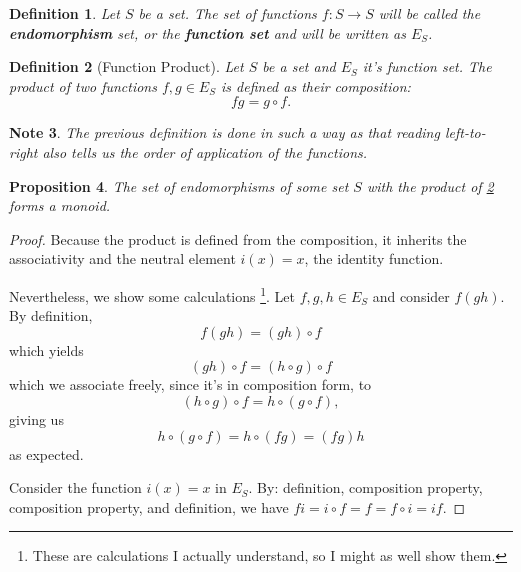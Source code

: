 \documentclass[11pt]{article}
\theoremstyle{plain}
\newtheorem{definition}{Definition}[section]
\newtheorem{note}[definition]{Note}
\newtheorem{proposition}[definition]{Proposition}
\theoremstyle{nonumberplain}
\newtheorem{proof}[definition]{Proof}
\begin{document}
\begin{definition}
    Let $S$ be a set. The set of functions $f : S \to S$ will be called the \textbf{endomorphism} set, or the \textbf{function set} and will be written as $E_S$.
\end{definition}

\begin{definition}[Function Product] \label{def:function_product}
    Let $S$ be a set and $E_S$ it's function set. The product of two functions $f, g \in E_S$ is defined as their composition: \begin{equation}
        fg = g \circ f.
    \end{equation}
\end{definition}

\begin{note}
    The previous definition is done in such a way as that reading left-to-right also tells us the order of application of the functions.
\end{note}

\begin{proposition}
    The set of endomorphisms of some set $S$ with the product of \ref{def:function_product} forms a monoid.
\end{proposition}

\begin{proof}
    Because the product is defined from the composition, it inherits the associativity and the neutral element $i(x) = x$, the identity function.

    Nevertheless, we show some calculations \footnote{These are calculations I actually understand, so I might as well show them.}. Let $f, g, h \in E_S$ and consider $f(gh)$. By definition, \begin{equation}
        f(gh) = (gh) \circ f
    \end{equation}
    which yields \begin{equation}
        (gh) \circ f = (h \circ g) \circ f
    \end{equation}
    which we associate freely, since it's in composition form, to \begin{equation}
        (h \circ g) \circ f = h \circ (g \circ f),
    \end{equation}
    giving us \begin{equation}
        h \circ (g \circ f) = h \circ (fg) = (fg)h
    \end{equation}
    as expected.

    Consider the function $i(x) = x$ in $E_S$. By: definition, composition property, composition property, and definition, we have $fi = i \circ f = f = f \circ i = if$.
\end{proof}
\end{document}
